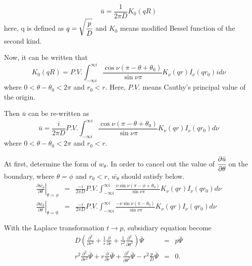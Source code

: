 \documentclass{article}
\begin{document}
\begin{equation} \label{Laplace-u-solution-infinite}
    \bar{u} = \frac{1}{2\pi D}K_0(qR)
\end{equation}
here, q is defined as $q = \sqrt{\cfrac{p}{D}}$ and $K_0$ means modified Bessel
 function of the second kind.

Now, it can be written that
\begin{equation}\label{expansion-K0}
    K_0(qR) = P.V.\int^{\infty i}_{-\infty i}
              \frac{\cos\nu (\pi - \theta + \theta_0)}{\sin\nu\pi}
              K_\nu(qr)I_\nu(qr_0)id\nu
\end{equation}
where $0 < \theta - \theta_0 < 2\pi$ and $r_0 < r$.
 Here, $P.V.$ means Cauthy's principal value of the origin.

Then $\bar{u}$ can be re-written as
\begin{equation}\label{expansion-bar-u}
    \bar{u} = \frac{i}{2\pi D}P.V.\int^{\infty i}_{-\infty i}
              \frac{\cos\nu (\pi - \theta + \theta_0)}{\sin\nu\pi}
              K_\nu(qr)I_\nu(qr_0)d\nu
\end{equation}
where $0 < \theta - \theta_0 < 2\pi$ and $r_0 < r$.

At first, determine the form of $w_\theta$. 
In order to cancel out the value of $\cfrac{\partial\bar{u}}{\partial\theta}$
on the boundary, where $\theta = \phi$ and $r_0 < r$, $\bar{w_\theta}$
should satisfy below.
\begin{eqnarray}
    \left.\frac{\partial\bar{w_\theta}}{\partial\theta}\right|_{\theta = \phi}
    &=& \frac{-i}{2\pi D}P.V.\int^{\infty i}_{-\infty i}
              \frac{\nu\sin\nu(\pi - \phi + \theta_0)}{\sin\nu\pi}
              K_\nu(qr)I_\nu(qr_0)d\nu\label{boundary-value-phi}\\
    \left.\frac{\partial\bar{w_\theta}}{\partial\theta}\right|_{\theta = 0}
    &=& \frac{-i}{2\pi D}P.V.\int^{\infty i}_{-\infty i}
              \frac{-\nu\sin\nu(\pi - \theta_0)}{\sin\nu\pi}
              K_\nu(qr)I_\nu(qr_0)d\nu \label{boundary-value-zero}
\end{eqnarray}

With the Laplace transformation $t\rightarrow p$, subsidiary equation become
\begin{eqnarray}
    D\left( \frac{\partial^2}{\partial r^2} +
            \frac{1}{r}\frac{\partial}{\partial r} +
            \frac{1}{r^2}\frac{\partial^2}{\partial \theta^2}
            \right)
    \bar{\Psi}
    &=&
    p\bar{\Psi} \nonumber \\
    r^2 \frac{\partial^2}{\partial r^2}\bar{\Psi} +
    r   \frac{\partial}{\partial r}\bar{\Psi} +
        \frac{\partial^2}{\partial \theta^2}\bar{\Psi} -
    r^2 \frac{p}{D}\bar{\Psi} &=& 0.
\end{eqnarray}
\end{document}
